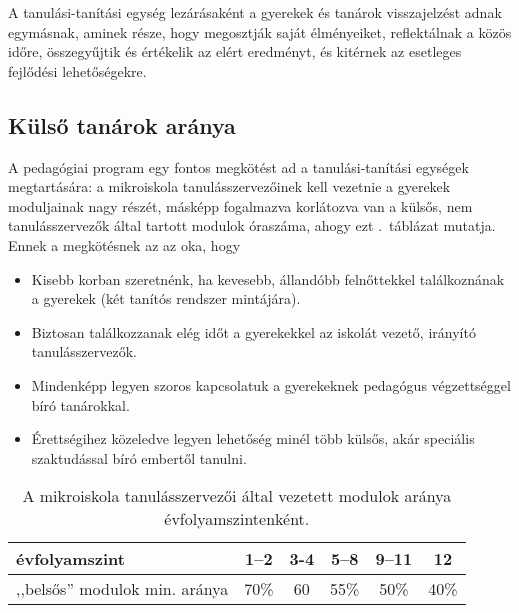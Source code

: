 A tanulási-tanítási egység lezárásaként a gyerekek és tanárok visszajelzést adnak egymásnak, aminek része, hogy megosztják saját élményeiket, reflektálnak a közös időre, összegyűjtik és értékelik az elért eredményt, és kitérnek az esetleges fejlődési lehetőségekre.

\subsection{Külső tanárok aránya}
A pedagógiai program egy fontos megkötést ad a tanulási-tanítási egységek megtartására: a mikroiskola tanulásszervezőinek kell vezetnie a gyerekek moduljainak nagy részét, másképp fogalmazva korlátozva van a külsős, nem tanulásszervezők által tartott modulok óraszáma, ahogy ezt .~táblázat mutatja.  Ennek a megkötésnek az az oka, hogy
\begin{itemize}
    \item Kisebb korban szeretnénk, ha kevesebb, állandóbb felnőttekkel találkoznának a gyerekek (két tanítós rendszer mintájára).
    \item Biztosan találkozzanak elég időt a gyerekekkel az iskolát vezető, irányító tanulásszervezők.
    \item Mindenképp legyen szoros kapcsolatuk a gyerekeknek pedagógus végzettséggel bíró tanárokkal.
    \item Érettségihez közeledve legyen lehetőség minél több külsős,
      akár
      speciális szaktudással bíró embertől tanulni.
\end{itemize}

\begin{table}[ht]
    \begin{center}
        \begin{tabular}{l|c|c|c|c|c}
            évfolyamszint                  & 1--2 & 3-4 & 5--8 & 9--11 & 12   \\ \hline
            ,,belsős'' modulok min. aránya & 70\% & 60  & 55\% & 50\%  & 40\%
        \end{tabular}
    \end{center}
    \caption{A mikroiskola tanulásszervezői által vezetett modulok aránya évfolyamszintenként.}
    \label{tbl:belso_modulok}
\end{table}

